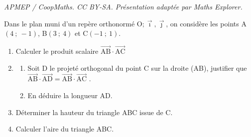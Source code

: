 \documentclass[10pt]{article}
\providecommand{\vv}[1]{\overrightarrow{#1}}
\providecommand{\vv}[1]{{\overrightarrow{#1}}}
\providecommand{\Oij}{\(\mathrm{O};\vec{\imath},\vec{\jmath}\)}
\begin{document}
\noindent\textit{APMEP / CoopMaths. CC BY-SA. Présentation adaptée par Maths Explorer.}\par\medskip
\medskip

Dans le plan muni d’un repère orthonormé \Oij, on considère les points A$(4~;~-1)$,
B$(3~;~4)$ et \mbox{C$(-1~;~1)$}.

\begin{enumerate}
\item Calculer le produit scalaire $\vv{\text{AB}}\cdot \vv{\text{AC}}$
\item \begin{enumerate}
\item Soit D le projeté orthogonal du point C sur la droite (AB), justifier que
$\vv{\text{AB}}\cdot\vv{\text{AD}} = \vv{\text{AB}}\cdot \vv{\text{AC}}$ .
\item En déduire la longueur AD.
\end{enumerate}
\item Déterminer la hauteur du triangle ABC issue de C.
\item Calculer l’aire du triangle ABC.
\end{enumerate}

\vspace{0,5cm}
\end{document}
